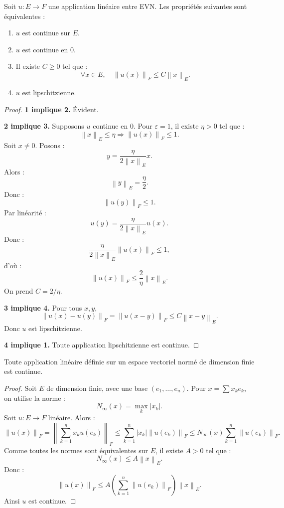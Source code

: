 \documentclass[11pt,a4paper]{article}
\newcommand{\norme}[1]{\left\lVert #1 \right\rVert}
\begin{document}
\begin{theorembox}[Caractérisation]
Soit \(u:E\to F\) une application linéaire entre EVN.  
Les propriétés suivantes sont équivalentes :
\begin{enumerate}
    \item \(u\) est continue sur \(E\).
    \item \(u\) est continue en \(0\).
    \item Il existe \(C\geq0\) tel que :
    \[
    \forall x\in E,\quad \norme{u(x)}_F\leq C\norme{x}_E.
    \]
    \item \(u\) est lipschitzienne.
\end{enumerate}
\end{theorembox}

\begin{proof}
\textbf{1 implique 2.} Évident.

\textbf{2 implique 3.}  
Supposons \(u\) continue en \(0\).  
Pour \(\varepsilon=1\), il existe \(\eta>0\) tel que :
\[
\norme{x}_E\leq \eta \Rightarrow \norme{u(x)}_F\leq 1.
\]
Soit \(x\neq0\). Posons :
\[
y=\frac{\eta}{2\norme{x}_E}x.
\]
Alors :
\[
\norme{y}_E=\frac{\eta}{2}.
\]
Donc :
\[
\norme{u(y)}_F\leq1.
\]
Par linéarité :
\[
u(y)=\frac{\eta}{2\norme{x}_E}u(x).
\]
Donc :
\[
\frac{\eta}{2\norme{x}_E}\norme{u(x)}_F\leq1,
\]
d'où :
\[
\norme{u(x)}_F\leq \frac{2}{\eta}\norme{x}_E.
\]
On prend \(C=2/\eta\).

\textbf{3 implique 4.}  
Pour tous \(x,y\),
\[
\norme{u(x)-u(y)}_F=\norme{u(x-y)}_F\leq C\norme{x-y}_E.
\]
Donc \(u\) est lipschitzienne.

\textbf{4 implique 1.}  
Toute application lipschitzienne est continue.
\end{proof}

\begin{theorembox}
Toute application linéaire définie sur un espace vectoriel normé de dimension finie est continue.
\end{theorembox}

\begin{proof}
Soit \(E\) de dimension finie, avec une base \((e_1,\dots,e_n)\).  
Pour \(x=\sum x_ke_k\), on utilise la norme :
\[
N_\infty(x)=\max_k |x_k|.
\]
Soit \(u:E\to F\) linéaire. Alors :
\[
\norme{u(x)}_F
=
\norme{\sum_{k=1}^n x_ku(e_k)}_F
\leq
\sum_{k=1}^n |x_k|\norme{u(e_k)}_F
\leq
N_\infty(x)\sum_{k=1}^n \norme{u(e_k)}_F.
\]
Comme toutes les normes sont équivalentes sur \(E\), il existe \(A>0\) tel que :
\[
N_\infty(x)\leq A\norme{x}_E.
\]
Donc :
\[
\norme{u(x)}_F\leq A\left(\sum_{k=1}^n \norme{u(e_k)}_F\right)\norme{x}_E.
\]
Ainsi \(u\) est continue.
\end{proof}
\end{document}
